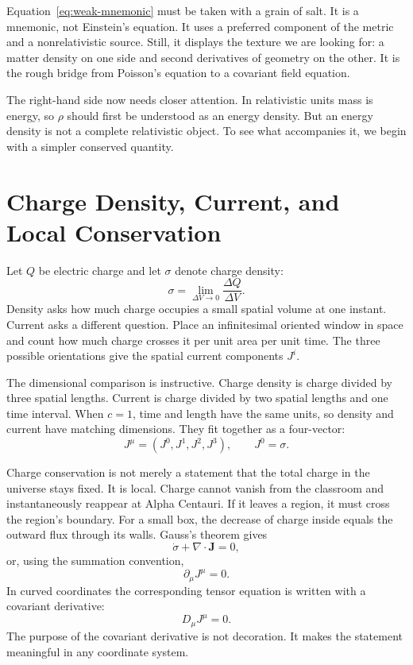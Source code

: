 Equation~\eqref{eq:weak-mnemonic} must be taken with a grain of salt. It is a
mnemonic, not Einstein's equation. It uses a preferred component of the
metric and a nonrelativistic source. Still, it displays the texture we are
looking for: a matter density on one side and second derivatives of geometry
on the other. It is the rough bridge from Poisson's equation to a covariant
field equation.

The right-hand side now needs closer attention. In relativistic units mass is
energy, so \(\rho\) should first be understood as an energy density. But an
energy density is not a complete relativistic object. To see what accompanies
it, we begin with a simpler conserved quantity.

\section{Charge Density, Current, and Local Conservation}

Let \(Q\) be electric charge and let \(\sigma\) denote charge density:
\begin{equation}
 \sigma=\lim_{\Delta V\to0}\frac{\Delta Q}{\Delta V}.
\end{equation}
Density asks how much charge occupies a small spatial volume at one instant.
Current asks a different question. Place an infinitesimal oriented window in
space and count how much charge crosses it per unit area per unit time. The
three possible orientations give the spatial current components \(J^i\).

The dimensional comparison is instructive. Charge density is charge divided
by three spatial lengths. Current is charge divided by two spatial lengths
and one time interval. When \(c=1\), time and length have the same units, so
density and current have matching dimensions. They fit together as a
four-vector:
\begin{equation}
 J^\mu=(J^0,J^1,J^2,J^3),
 \qquad J^0=\sigma.
\end{equation}

Charge conservation is not merely a statement that the total charge in the
universe stays fixed. It is local. Charge cannot vanish from the classroom
and instantaneously reappear at Alpha Centauri. If it leaves a region, it
must cross the region's boundary. For a small box, the decrease of charge
inside equals the outward flux through its walls. Gauss's theorem gives
\begin{equation}
 \dot{\sigma}+\nabla\cdot\mathbf{J}=0,
\end{equation}
or, using the summation convention,
\begin{equation}
 \partial_\mu J^\mu=0.
 \label{eq:charge-continuity}
\end{equation}
In curved coordinates the corresponding tensor equation is written with a
covariant derivative:
\begin{equation}
 D_\mu J^\mu=0.
\end{equation}
The purpose of the covariant derivative is not decoration. It makes the
statement meaningful in any coordinate system.

